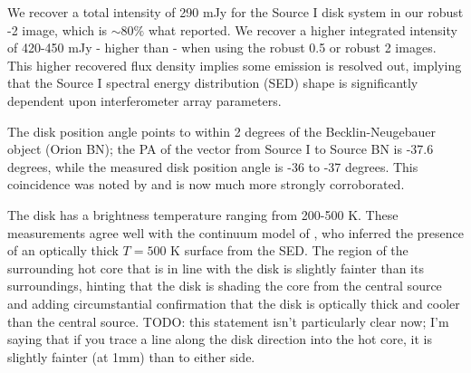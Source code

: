 \documentclass[twocolumn]{aastex61}
\begin{document}
We recover a total intensity of 290 mJy for the Source I disk
system in our robust -2 image, which is  $\sim80\%$ what
\citet{Plambeck2016a} reported.  We recover a higher integrated intensity of
420-450 mJy - higher than \citet{Plambeck2016a} - when using the robust 0.5 
or robust 2 images.  This higher recovered flux density implies some emission
is resolved out, implying that the Source I spectral energy distribution (SED)
shape is significantly dependent upon interferometer array parameters.



The disk position angle points to within 2 degrees of the Becklin-Neugebauer
object (Orion BN); the PA of the vector from Source I to Source BN is -37.6
degrees, while the measured disk position angle is -36 to -37 degrees.
This coincidence was noted by \citet{Bally2011a} and is now much more strongly
corroborated.


The disk has a brightness temperature ranging from 200-500 K.  These measurements
agree well with the continuum model of \citet{Plambeck2016a}, who inferred
the presence of an optically thick $T=500$ K surface from the SED.
{\color{red} The region of the surrounding hot core that is in line with the
disk is slightly fainter than its surroundings, hinting that the disk
is shading the core from the central source and adding circumstantial
confirmation that the disk is optically thick and cooler than the central
source.   TODO: this statement isn't particularly clear now; I'm saying
that if you trace a line along the disk direction into the hot core, it is slightly
fainter (at 1mm) than to either side.}
\end{document}
